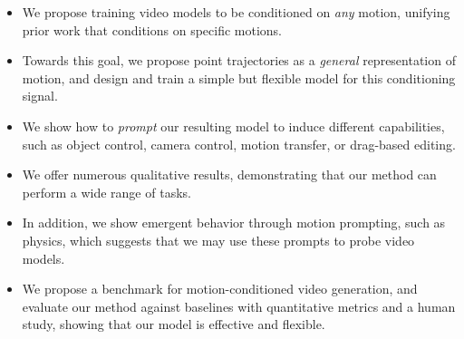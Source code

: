 {\begin{itemize}
    \item We propose training video models to be conditioned on {\it any} motion, unifying prior work that conditions on specific motions.
    \item Towards this goal, we propose point trajectories as a {\it general} representation of motion, and design and train a simple but flexible model for this conditioning signal.
    \item We show how to {\it prompt} our resulting model to induce different capabilities, such as object control, camera control, motion transfer, or drag-based editing.    
    \item We offer numerous qualitative results, demonstrating that our method can perform a wide range of tasks. 
    \item In addition, we show emergent behavior through motion prompting, such as physics, which suggests that we may use these prompts to probe video models.
    \item We propose a benchmark for motion-conditioned video generation, and evaluate our method against baselines with quantitative metrics and a human study, showing that our model is effective and flexible.
\end{itemize}


}







